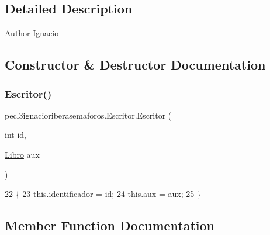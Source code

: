 \subsection{Detailed Description}
\begin{DoxyAuthor}{Author}
Ignacio 
\end{DoxyAuthor}


\subsection{Constructor \& Destructor Documentation}
\mbox{\label{classpecl3ignacioriberasemaforos_1_1_escritor_ac8030392b7fea613a67850ab0627806f}} 
\subsubsection{\texorpdfstring{Escritor()}{Escritor()}}
{\footnotesize\ttfamily pecl3ignacioriberasemaforos.\+Escritor.\+Escritor (\begin{DoxyParamCaption}\item[{int}]{id,  }\item[{\mbox{\hyperlink{classpecl3ignacioriberasemaforos_1_1_libro}{Libro}}}]{aux }\end{DoxyParamCaption})\hspace{0.3cm}{\ttfamily [inline]}}


\begin{DoxyCode}
22     \{
23         this.\mbox{\hyperlink{classpecl3ignacioriberasemaforos_1_1_escritor_a991425a23a35a53239d3c22a16eeba2d}{identificador}} = id;
24         this.\mbox{\hyperlink{classpecl3ignacioriberasemaforos_1_1_escritor_acb29c7b48dcc9bf7484acf45cdc97f48}{aux}} = \mbox{\hyperlink{classpecl3ignacioriberasemaforos_1_1_escritor_acb29c7b48dcc9bf7484acf45cdc97f48}{aux}};
25     \}
\end{DoxyCode}


\subsection{Member Function Documentation}
\mbox{\label{classpecl3ignacioriberasemaforos_1_1_escritor_a2fdd467ba05eef92d16bcf1a2edaa67d}} 
